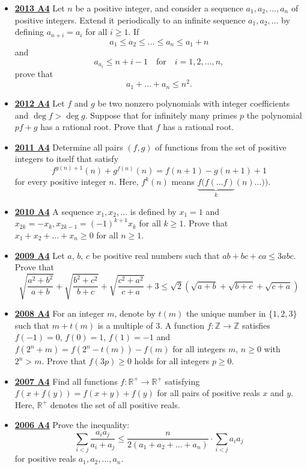 \documentclass[11pt]{scrartcl}
\begin{document}
\begin{itemize}[leftmargin=*]
\item \href{https://artofproblemsolving.com/community/c6h597122p3543362}{\textbf{2013 A4}} 	Let $n$ be a positive integer, and consider a sequence $a_1 , a_2 , \dots , a_n $ of positive integers. Extend it periodically to an infinite sequence $a_1 , a_2 , \dots $ by defining $a_{n+i} = a_i $ for all $i \geqslant 1$. If\[a_1 \leqslant a_2 \leqslant \dots \leqslant a_n \leqslant a_1 +n  \]and\[a_{a_i } \leqslant n+i-1 \quad\text{for}\quad i=1,2,\dots, n, \]prove that\[a_1 + \dots +a_n \leqslant n^2. \]
\item \href{https://artofproblemsolving.com/community/c6h546164p3160553}{\textbf{2012 A4}} 	Let $f$ and $g$ be two nonzero polynomials with integer coefficients and $\deg f>\deg g$. Suppose that for infinitely many primes $p$ the polynomial $pf+g$ has a rational root. Prove that $f$ has a rational root.
\item \href{https://artofproblemsolving.com/community/c6h488536p2737644}{\textbf{2011 A4}} Determine all pairs $(f,g)$ of functions from the set of positive integers to itself that satisfy\[f^{g(n)+1}(n) + g^{f(n)}(n) = f(n+1) - g(n+1) + 1\]for every positive integer $n$. Here, $f^k(n)$ means $\underbrace{f(f(\dots f)}_{k}(n) \dots ))$.
\item \href{https://artofproblemsolving.com/community/c6h418681p2362283}{\textbf{2010 A4}} A sequence $x_1, x_2, \dots$ is defined by $x_1 = 1$ and $x_{2k}=-x_k, x_{2k-1} = (-1)^{k+1}x_k$ for all $k \geqslant  1.$ Prove that $x_1 + x_2 + \dots + x_n \geqslant  0$ for all $n\geqslant 1$.
\item \href{https://artofproblemsolving.com/community/c6h355782p1932920}{\textbf{2009 A4}} 	Let $a$, $b$, $c$ be positive real numbers such that $ab+bc+ca\leqslant 3abc$. Prove that
\[\sqrt{\frac{a^2+b^2}{a+b}}+\sqrt{\frac{b^2+c^2}{b+c}}+\sqrt{\frac{c^2+a^2}{c+a}}+3\leqslant \sqrt{2}\left(\sqrt{a+b}+\sqrt{b+c}+\sqrt{c+a}\right)\] 
\item \href{https://artofproblemsolving.com/community/c6h287853p1555896}{\textbf{2008 A4}} 	For an integer $ m$, denote by $ t(m)$ the unique number in $ \{1, 2, 3\}$ such that $ m + t(m)$ is a multiple of $ 3$. A function $ f: \mathbb{Z}\to\mathbb{Z}$ satisfies $ f( - 1) = 0$, $ f(0) = 1$, $ f(1) = - 1$ and $ f\left(2^{n} + m\right) = f\left(2^n - t(m)\right) - f(m)$ for all integers $ m$, $ n\geqslant 0$ with $ 2^n > m$. Prove that $ f(3p)\geqslant 0$ holds for all integers $ p\geqslant 0$.
\item \href{https://artofproblemsolving.com/community/c6h211465p1165901}{\textbf{2007 A4}} Find all functions $ f: \mathbb{R}^{ + }\to\mathbb{R}^{ + }$ satisfying $ f\left(x + f\left(y\right)\right) = f\left(x + y\right) + f\left(y\right)$ for all pairs of positive reals $ x$ and $ y$. Here, $ \mathbb{R}^{ + }$ denotes the set of all positive reals. 
\item \href{https://artofproblemsolving.com/community/c6h155691p874975}{\textbf{2006 A4}} Prove the inequality:
\[\sum_{i < j}{\frac {a_{i}a_{j}}{a_{i} + a_{j}}}\leqslant \frac {n}{2(a_{1} + a_{2} +\dots + a_{n})}\cdot \sum_{i < j}{a_{i}a_{j}}\]
for positive reals $ a_{1},a_{2},\dots,a_{n}$.
\end{itemize}
\end{document}
